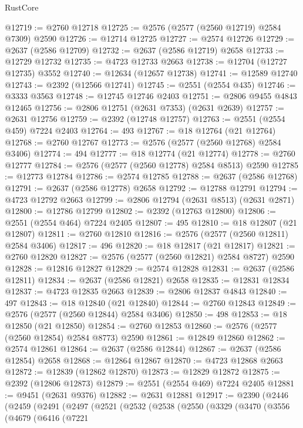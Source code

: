 \begin{lexlean}{RustCore}
\begin{coremodule}
@12719 := @2760 @12718
@12725 := @2576 (@2577 (@2560 @12719) @2584 @7309) @2590
@12726 := @12714 @12725
@12727 := @2574 @12726
@12729 := @2637 (@2586 @12709)
@12732 := @2637 (@2586 @12719) @2658
@12733 := @12729 @12732
@12735 := @4723 @12733 @2663
@12738 := @12704 (@12727 @12735) @3552
@12740 := @12634 (@12657 @12738)
@12741 := @12589 @12740
@12743 := @2392 (@12566 @12741)
@12745 := @2551 (@2554 @435)
@12746 := @3333 @3563
@12748 := @12745 @12746 @2403
@12751 := @2806 @9455 @4843 @12465
@12756 := @2806 @12751 (@2631 @7353) (@2631 @2639)
@12757 := @2631 @12756
@12759 := @2392 (@12748 @12757)
@12763 := @2551 (@2554 @459) @7224 @2403
@12764 := 493
@12767 := @18 @12764 (@21 @12764)
@12768 := @2760 @12767
@12773 := @2576 (@2577 (@2560 @12768) @2584 @3406)
@12774 := 494
@12777 := @18 @12774 (@21 @12774)
@12778 := @2760 @12777
@12784 := @2576 (@2577 (@2560 @12778) @2584 @8513) @2590
@12785 := @12773 @12784
@12786 := @2574 @12785
@12788 := @2637 (@2586 @12768)
@12791 := @2637 (@2586 @12778) @2658
@12792 := @12788 @12791
@12794 := @4723 @12792 @2663
@12799 := @2806 @12794 (@2631 @8513) (@2631 @2871)
@12800 := @12786 @12799
@12802 := @2392 (@12763 @12800)
@12806 := @2551 (@2554 @464) @7224 @2405
@12807 := 495
@12810 := @18 @12807 (@21 @12807)
@12811 := @2760 @12810
@12816 := @2576 (@2577 (@2560 @12811) @2584 @3406)
@12817 := 496
@12820 := @18 @12817 (@21 @12817)
@12821 := @2760 @12820
@12827 := @2576 (@2577 (@2560 @12821) @2584 @8727) @2590
@12828 := @12816 @12827
@12829 := @2574 @12828
@12831 := @2637 (@2586 @12811)
@12834 := @2637 (@2586 @12821) @2658
@12835 := @12831 @12834
@12837 := @4723 @12835 @2663
@12839 := @2806 @12837 @4843
@12840 := 497
@12843 := @18 @12840 (@21 @12840)
@12844 := @2760 @12843
@12849 := @2576 (@2577 (@2560 @12844) @2584 @3406)
@12850 := 498
@12853 := @18 @12850 (@21 @12850)
@12854 := @2760 @12853
@12860 := @2576 (@2577 (@2560 @12854) @2584 @8773) @2590
@12861 := @12849 @12860
@12862 := @2574 @12861
@12864 := @2637 (@2586 @12844)
@12867 := @2637 (@2586 @12854) @2658
@12868 := @12864 @12867
@12870 := @4723 @12868 @2663
@12872 := @12839 (@12862 @12870)
@12873 := @12829 @12872
@12875 := @2392 (@12806 @12873)
@12879 := @2551 (@2554 @469) @7224 @2405
@12881 := @9451 (@2631 @9376)
@12882 := @2631 @12881
@12917 := @2390
    (@2446
      (@2459
        (@2491
          (@2497
            (@2521
              (@2532
                (@2538
                  (@2550
                    (@3329
                      (@3470
                        (@3556
                          (@4679
                            (@6416
                              (@7221

\end{coremodule}
\end{lexlean}
